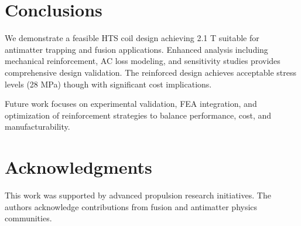 \documentclass[10pt,twocolumn]{article}
\begin{document}
\section{Conclusions}

We demonstrate a feasible HTS coil design achieving 2.1 T suitable for antimatter trapping and fusion applications. Enhanced analysis including mechanical reinforcement, AC loss modeling, and sensitivity studies provides comprehensive design validation. The reinforced design achieves acceptable stress levels (28 MPa) though with significant cost implications.

Future work focuses on experimental validation, FEA integration, and optimization of reinforcement strategies to balance performance, cost, and manufacturability.

\section{Acknowledgments}

This work was supported by advanced propulsion research initiatives. The authors acknowledge contributions from fusion and antimatter physics communities.
\end{document}

